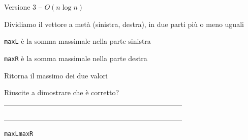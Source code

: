 \begin{frame}[fragile]{Versione 3 -- $O(n \log n)$}

\vspace{-9pt}
\begin{myboxtitle}
\BIL
\item Dividiamo il vettore a metà (sinistra, destra), in due parti più o meno uguali
\item \texttt{maxL} è la somma massimale nella parte sinistra
\item \texttt{maxR} è la somma massimale nella parte destra
\item Ritorna il massimo dei due valori
\item Riuscite a dimostrare che è corretto?
\EIL
\end{myboxtitle}


\begin{center}
\begingroup
\LARGE
\begin{tabular}{!{\vrule width 1.5pt}p{0.30cm}|p{0.30cm}|p{0.30cm}|p{0.30cm}|p{0.30cm}|p{0.30cm}|p{0.30cm}|p{0.30cm}!{\vrule width 1.5pt}p{0.30cm}|p{0.30cm}|p{0.30cm}|p{0.30cm}|p{0.30cm}|p{0.30cm}|p{0.30cm}|p{0.30cm}!{\vrule width 1.5pt}}
~~&&&&&~~&~~&~~&~~&~~&~~&~~&~~&&&\\
\end{tabular}
\endgroup
\end{center}
\Large
\hspace*{1.7cm}\texttt{maxL}\hspace*{7.6cm}\texttt{maxR}

\end{frame}

